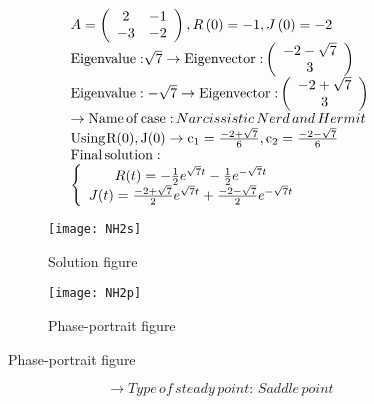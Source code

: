 \documentclass[a4paper]{article}
\begin{document}
\[\begin{array}{l}
A = \left( {\begin{array}{*{20}{c}}
2&{ - 1}\\
{ - 3}&{ - 2}
\end{array}} \right),R\left( 0 \right) =  - 1,J\left( 0 \right) =  - 2\\
{\rm{Eigenvalue:}}\sqrt 7  \to {\rm{Eigenvector:}}\left( {\begin{array}{*{20}{c}}
{ - 2 - \sqrt 7 }\\
3
\end{array}} \right)\\
{\rm{Eigenvalue: - }}\sqrt 7  \to {\rm{Eigenvector:}}\left( {\begin{array}{*{20}{c}}
{ - 2 + \sqrt 7 }\\
3
\end{array}} \right)\\
 \to {\rm{Name}}\,{\rm{of}}\,{\rm{case:}}\,Narcissistic\,Nerd\,and\,Hermit\\
{\rm{Using}}{\mkern 1mu} {\rm{R}}({\rm{0}}),{\rm{J}}({\rm{0}}) \to {{\rm{c}}_1} = \frac{{ - 2 + \sqrt 7 }}{6},{{\rm{c}}_2} = \frac{{ - 2 - \sqrt 7 }}{6}\\
{\rm{Final}}\,{\rm{solution:}}\\
\left\{ {\begin{array}{*{20}{c}}
{R(t) =  - \frac{1}{2}{e^{\sqrt 7 t}} - \frac{1}{2}{e^{ - \sqrt 7 t}}}\\
{J(t) = \frac{{ - 2 + \sqrt 7 }}{2}{e^{\sqrt 7 t}} + \frac{{ - 2 - \sqrt 7 }}{2}{e^{ - \sqrt 7 t}}}
\end{array}} \right.
\end{array}\]
\begin{figure}[H]
\centering
\begin{subfigure}{.5\textwidth}
  \centering
  \texttt{[image: NH2s]}
  \caption*{Solution figure}
\end{subfigure}%
\begin{subfigure}{.5\textwidth}
  \centering
  \texttt{[image: NH2p]}
  \caption*{Phase-portrait figure}
\end{subfigure}
\end{figure}
\[  \to  Type\,of\,steady\,point:\,Saddle\,point\]
\end{document}
